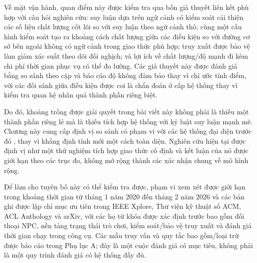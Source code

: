 ﻿\documentclass[a4paper,12pt]{article}
\begin{document}
Về mặt vận hành, quan điểm này được kiểm tra qua bốn giả thuyết liên kết phù hợp với câu hỏi nghiên cứu: suy luận dựa trên ngữ cảnh có kiểm soát cải thiện các số liệu chất lượng cốt lõi so với suy luận theo ngữ cảnh thô; cùng một cấu hình kiểm soát tạo ra khoảng cách chất lượng giữa các điều kiện so với đường cơ sở bên ngoài không có ngữ cảnh trong giao thức phù hợp; truy xuất được bảo vệ làm giảm xác suất theo dõi đối nghịch; và lợi ích về chất lượng/độ mạnh đi kèm chi phí thời gian phục vụ có thể đo lường. Các giả thuyết này được đánh giá bằng so sánh theo cặp và báo cáo độ không đảm bảo thay vì chỉ ước tính điểm, với các đối sánh giữa điều kiện được coi là chẩn đoán ở cấp hệ thống thay vì kiểm tra quan hệ nhân quả thành phần riêng biệt.

Do đó, khoảng trống được giải quyết trong bài viết này không phải là thiếu một thành phần riêng lẻ mà là thiếu tích hợp hệ thống với kỷ luật suy luận mạnh mẽ. Chương này cung cấp định vị so sánh có phạm vi với các hệ thống đại diện trước đó \cite{Gallotta2024Survey,Sweetser2024Scoping,Rao2024Minecraft}, thay vì khẳng định tính mới một cách toàn diện. Nghiên cứu hiện tại được định vị như một thử nghiệm tích hợp giao thức cố định và kết luận của nó được giới hạn theo các trục đo, không mở rộng thành các xác nhận chung về mô hình rộng.

Để làm cho tuyên bố này có thể kiểm tra được, phạm vi xem xét được giới hạn trong khoảng thời gian từ tháng 1 năm 2020 đến tháng 2 năm 2026 và các bản ghi được lập chỉ mục ưu tiên trong IEEE Xplore, Thư viện kỹ thuật số ACM, ACL Anthology và arXiv, với các họ từ khóa được xác định trước bao gồm đối thoại NPC, nền tảng trạng thái trò chơi, kiểm soát/bảo vệ truy xuất và đánh giá thời gian chạy trong công cụ. Các mẫu truy vấn và quy tắc bao gồm/loại trừ được báo cáo trong Phụ lục A; đây là một cuộc đánh giá có mục tiêu, không phải là một quy trình đánh giá có hệ thống đầy đủ.
\end{document}
